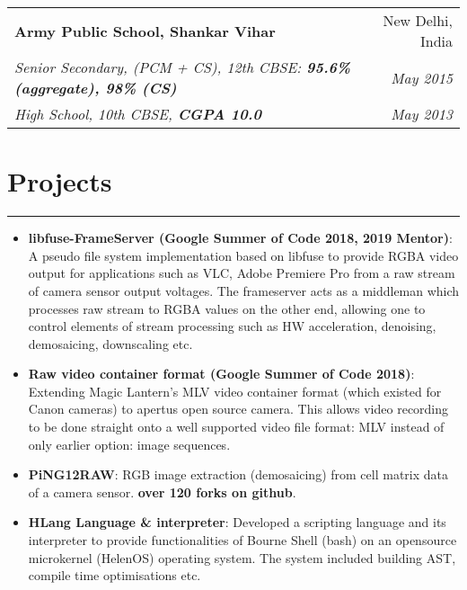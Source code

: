 \documentclass[a4paper,6pt]{article}
\begin{document}
\vspace{5px}
\hspace{5px}
\begin{tabularx}{\textwidth}{X r}
	\textbf{Army Public School, Shankar Vihar} & New Delhi, India \\
	\textit{\small Senior Secondary, (PCM + CS), 12th CBSE:  \textcolor{mygray}{\textbf{95.6\% (aggregate), 98\% (CS)}}} & \textit{May 2015} \\
	\textit{\small High School, 10th CBSE, \textcolor{mygray}{\textbf{CGPA 10.0}}} & \textit{May 2013}
\end{tabularx}




\section*{Projects}
\vspace{-8px}
\hrule
\vspace{4px}
\hspace{5px}
\begin{itemize}
    \item \textbf{libfuse-FrameServer (Google Summer of Code 2018, 2019 Mentor)}:  \small A pseudo file system implementation based on libfuse to provide RGBA video output for applications such as VLC, Adobe Premiere Pro from a raw stream of camera sensor output voltages. The frameserver acts as a middleman which processes raw stream to RGBA values on the other end, allowing one to control elements of stream processing such as HW acceleration, denoising, demosaicing, downscaling etc.\normalsize
\vspace{2px}
    \item \textbf{Raw video container format (Google Summer of Code 2018)}: \small Extending Magic Lantern's MLV video container format (which existed for Canon cameras) to apertus open source camera. This allows video recording to be done straight onto a well supported video file format: MLV instead of only earlier option: image sequences.
 \vspace{2px}
\normalsize
	\item \textbf{PiNG12RAW}: \small RGB image extraction (demosaicing) from cell matrix data of a camera sensor. \textcolor{mygray}{\textbf{over 120 forks on github}}. 
\normalsize
\vspace{2px}
    \item \textbf{HLang Language \& interpreter}: \small Developed a scripting language and its interpreter to provide functionalities of Bourne Shell (bash) on an opensource microkernel (HelenOS) operating system. The system included building AST, compile time optimisations etc. 

\normalsize
\end{itemize}
\end{document}
